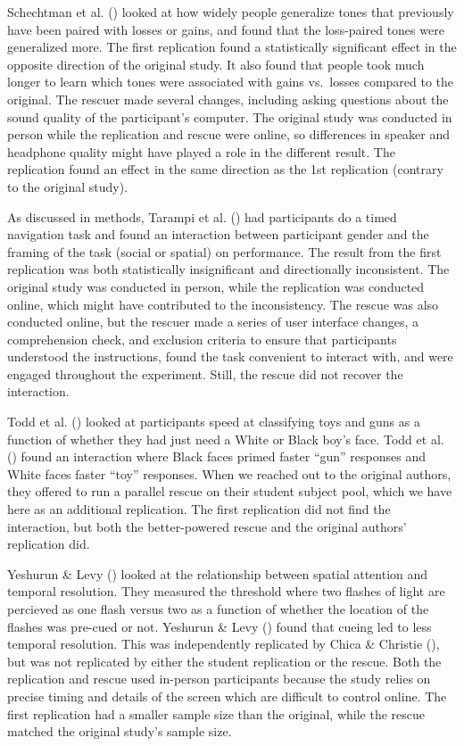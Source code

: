 \documentclass[
  english,
  a4paper,
]{article}
\begin{document}
Schechtman et al. () looked at how widely people generalize tones that previously have been paired with losses or gains, and found that the loss-paired tones were generalized more.
The first replication found a statistically significant effect in the opposite direction of the original study.
It also found that people took much longer to learn which tones were associated with gains vs.~losses compared to the original.
The rescuer made several changes, including asking questions about the sound quality of the participant's computer.
The original study was conducted in person while the replication and rescue were online, so differences in speaker and headphone quality might have played a role in the different result.
The replication found an effect in the same direction as the 1st replication (contrary to the original study).

As discussed in methods, Tarampi et al. () had participants do a timed navigation task and found an interaction between participant gender and the framing of the task (social or spatial) on performance.
The result from the first replication was both statistically insignificant and directionally inconsistent.
The original study was conducted in person, while the replication was conducted online, which might have contributed to the inconsistency.
The rescue was also conducted online, but the rescuer made a series of user interface changes, a comprehension check, and exclusion criteria to ensure that participants understood the instructions, found the task convenient to interact with, and were engaged throughout the experiment.
Still, the rescue did not recover the interaction.

Todd et al. () looked at participants speed at classifying toys and guns as a function of whether they had just need a White or Black boy's face.
Todd et al. () found an interaction where Black faces primed faster ``gun'' responses and White faces faster ``toy'' responses.
When we reached out to the original authors, they offered to run a parallel rescue on their student subject pool, which we have here as an additional replication.
The first replication did not find the interaction, but both the better-powered rescue and the original authors' replication did.

Yeshurun \& Levy () looked at the relationship between spatial attention and temporal resolution.
They measured the threshold where two flashes of light are percieved as one flash versus two as a function of whether the location of the flashes was pre-cued or not.
Yeshurun \& Levy () found that cueing led to less temporal resolution.
This was independently replicated by Chica \& Christie (), but was not replicated by either the student replication or the rescue.
Both the replication and rescue used in-person participants because the study relies on precise timing and details of the screen which are difficult to control online.
The first replication had a smaller sample size than the original, while the rescue matched the original study's sample size.
\end{document}
